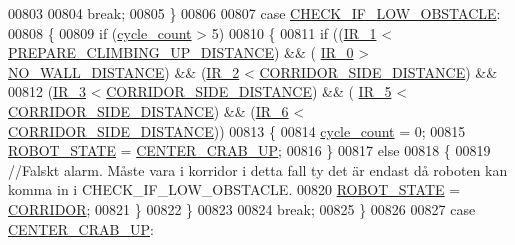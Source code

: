 \begin{DoxyCode}
00803             
00804             \textcolor{keywordflow}{break};
00805         \}
00806         
00807         \textcolor{keywordflow}{case} \hyperlink{state__machine_8h_a94b1da2e055fff4d143aa6aa891f79a9a8db1ac2c741bbe4f478028e524d2a6df}{CHECK\_IF\_LOW\_OBSTACLE}:
00808         \{
00809             \textcolor{keywordflow}{if} (\hyperlink{state__machine_8c_a937f74a65988b9e22241ab3765b82c50}{cycle\_count} > 5)
00810             \{
00811                 \textcolor{keywordflow}{if} ((\hyperlink{state__machine_8c_adee1bbc4817ed82271bd0d5904bda5d1}{IR\_1} < \hyperlink{state__machine_8c_a1bdeb86204e23b0e597ffe87d6579167}{PREPARE\_CLIMBING\_UP\_DISTANCE}) && (
      \hyperlink{state__machine_8c_a7afcf874a71b2cde367dc9c28f5f01f1}{IR\_0} > \hyperlink{state__machine_8c_a9d981c215ebe94b6be6a0d49ccd2dce8}{NO\_WALL\_DISTANCE}) && (\hyperlink{state__machine_8c_a07cfb2e201909d017a88a2a86c32cd4b}{IR\_2} < 
      \hyperlink{state__machine_8c_a201d56046ddf552d57b4862e0ec07a10}{CORRIDOR\_SIDE\_DISTANCE}) &&
00812                     (\hyperlink{state__machine_8c_a7831b71dc250258ecefe0e23f9920688}{IR\_3} < \hyperlink{state__machine_8c_a201d56046ddf552d57b4862e0ec07a10}{CORRIDOR\_SIDE\_DISTANCE}) && (
      \hyperlink{state__machine_8c_ad00ba6cc1cf461bda7059f5aafc06142}{IR\_5} < \hyperlink{state__machine_8c_a201d56046ddf552d57b4862e0ec07a10}{CORRIDOR\_SIDE\_DISTANCE}) && (\hyperlink{state__machine_8c_a8c51bcd8b555e8c78fea79b88d28b55e}{IR\_6} < 
      \hyperlink{state__machine_8c_a201d56046ddf552d57b4862e0ec07a10}{CORRIDOR\_SIDE\_DISTANCE}))
00813                 \{
00814                     \hyperlink{state__machine_8c_a937f74a65988b9e22241ab3765b82c50}{cycle\_count} = 0;
00815                     \hyperlink{state__machine_8h_a5e5321a4a9085b83c8161454bf7a145c}{ROBOT\_STATE} = \hyperlink{state__machine_8h_a94b1da2e055fff4d143aa6aa891f79a9a485e352985200ac43f71243cc29b16ad}{CENTER\_CRAB\_UP};
00816                 \}
00817                 \textcolor{keywordflow}{else}
00818                 \{
00819                     \textcolor{comment}{//Falskt alarm. Måste vara i korridor i detta fall ty det är endast då roboten kan
       komma in i CHECK\_IF\_LOW\_OBSTACLE. }
00820                     \hyperlink{state__machine_8h_a5e5321a4a9085b83c8161454bf7a145c}{ROBOT\_STATE} = \hyperlink{state__machine_8h_a94b1da2e055fff4d143aa6aa891f79a9af4fc00ebf5a552ca632130e794617d58}{CORRIDOR};
00821                 \}
00822             \}
00823             
00824             \textcolor{keywordflow}{break};
00825         \}
00826         
00827         \textcolor{keywordflow}{case} \hyperlink{state__machine_8h_a94b1da2e055fff4d143aa6aa891f79a9a485e352985200ac43f71243cc29b16ad}{CENTER\_CRAB\_UP}:

\end{DoxyCode}
